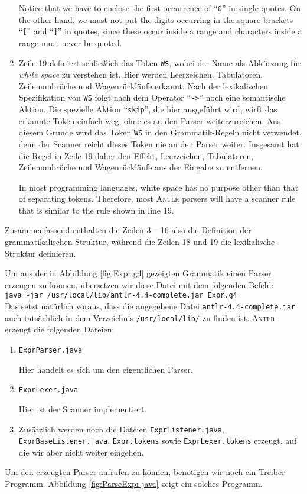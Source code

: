 \begin{enumerate}
      Notice that we have to enclose the first occurrence of ``\texttt{0}'' in single quotes.
      On the other hand, we must not put the digits occurring in the square brackets ``\texttt{[}'' 
      and ``\texttt{]}'' in quotes, since these occur inside a range and characters inside a range
      must never be quoted.
\item Zeile 19 definiert schlie{\ss}lich das Token \texttt{WS}, wobei der Name als Abk\"urzung
      f\"ur \emph{white space} zu verstehen ist.  Hier werden Leerzeichen, Tabulatoren,
      Zeilenumbr\"uche und Wagenr\"uckl\"aufe erkannt.  Nach der lexikalischen Spezifikation
      von \texttt{WS} folgt nach dem Operator ``\texttt{->}'' noch eine semantische Aktion.
      Die spezielle Aktion ``\texttt{skip}'', die hier ausgef\"uhrt wird, wirft das erkannte
      Token einfach weg, ohne es an den Parser weiterzureichen.  Aus diesem Grunde wird das Token
      \texttt{WS} in den Grammatik-Regeln nicht verwendet, denn der Scanner reicht dieses Token nie
      an den Parser weiter.  Insgesamt hat die Regel in Zeile 19 daher den Effekt, Leerzeichen, Tabulatoren,
      Zeilenumbr\"uche und Wagenr\"uckl\"aufe aus der Eingabe zu entfernen.

      In most programming languages, white space has no purpose other than that of separating
      tokens.  Therefore, most \textsc{Antlr} parsers will have a scanner rule that is similar to
      the rule shown in line 19. 
\end{enumerate}
Zusammenfassend enthalten die Zeilen 3 -- 16 also die Definition der grammatikalischen
Struktur, w\"ahrend die Zeilen 18 und 19 die lexikalische Struktur definieren.

Um aus der in Abbildung \ref{fig:Expr.g4} gezeigten Grammatik einen Parser erzeugen zu
k\"onnen,  \"ubersetzen wir diese Datei mit dem folgenden Befehl:
\\[0.2cm]
\hspace*{1.3cm}
\texttt{java -jar /usr/local/lib/antlr-4.4-complete.jar Expr.g4}
\\[0.2cm]
Das setzt nat\"urlich voraus, dass die angegebene Datei \texttt{antlr-4.4-complete.jar} auch
tats\"achlich in dem Verzeichnis \texttt{/usr/local/lib/} zu finden ist.
\textsc{Antlr} erzeugt die folgenden Dateien:
\begin{enumerate}
\item \texttt{ExprParser.java}

      Hier handelt es sich um den eigentlichen Parser.
\item \texttt{ExprLexer.java}

      Hier ist der Scanner implementiert.
\item Zus\"atzlich werden noch die Dateien \texttt{ExprListener.java},
      \texttt{ExprBaseListener.java}, \texttt{Expr.tokens} sowie \texttt{ExprLexer.tokens} erzeugt,
      auf die wir aber nicht weiter eingehen.
\end{enumerate}
Um den erzeugten Parser aufrufen zu k\"onnen, ben\"otigen wir noch ein Treiber-Programm.
Abbildung \ref{fig:ParseExpr.java} zeigt ein solches Programm.

